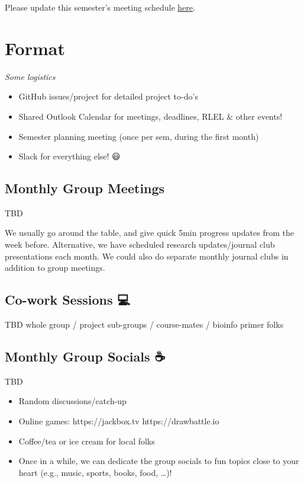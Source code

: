 \documentclass[
  letterpaper,
  DIV=11,
  numbers=noendperiod]{scrreprt}
\providecommand{\tightlist}{%
  \setlength{\itemsep}{0pt}\setlength{\parskip}{0pt}}\usepackage{longtable,booktabs,array}
\begin{document}
Please update this semester's meeting schedule
\href{https://github.com/JRaviLab/group/tree/master/meetings}{here}.

\hypertarget{format}{%
\section{Format}\label{format}}

\emph{Some logistics}

\begin{itemize}
\tightlist
\item
  GitHub issues/project for detailed project to-do's
\item
  Shared Outlook Calendar for meetings, deadlines, RLEL \& other events!
\item
  Semester planning meeting (once per sem, during the first month)
\item
  Slack for everything else! 😃
\end{itemize}

\hypertarget{monthly-group-meetings}{%
\subsection{Monthly Group Meetings}\label{monthly-group-meetings}}

TBD

We usually go around the table, and give quick 5min progress updates
from the week before. Alternative, we have scheduled research
updates/journal club presentations each month. We could also do separate
monthly journal clubs in addition to group meetings.

\hypertarget{co-work-sessions}{%
\subsection{Co-work Sessions 💻}\label{co-work-sessions}}

TBD \textbar{} whole group / project sub-groups / course-mates / bioinfo
primer folks

\hypertarget{monthly-group-socials}{%
\subsection{Monthly Group Socials ☕ 🍵
🥐}\label{monthly-group-socials}}

TBD

\begin{itemize}
\tightlist
\item
  Random discussions/catch-up
\item
  Online games: https://jackbox.tv \textbar{} https://drawbattle.io
\item
  Coffee/tea or ice cream for local folks
\item
  Once in a while, we can dedicate the group socials to fun topics close
  to your heart (e.g., music, sports, books, food, \ldots)!
\end{itemize}
\end{document}
